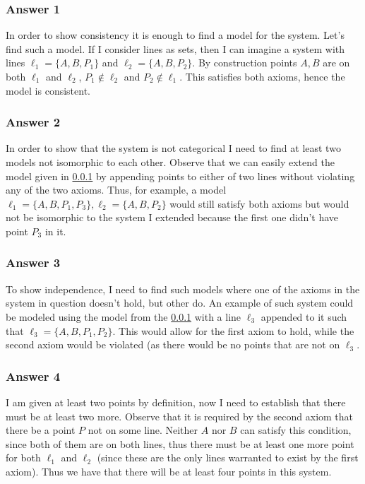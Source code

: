 \documentclass[11pt]{article}
\begin{document}
\subsubsection{Answer 1}
\label{sec-1-1-1}
In order to show consistency it is enough to find a model for the system.
Let's find such a model.  If I consider lines as sets, then I can imagine
a system with lines $\ell_1=\{A,B,P_1\}$ and $\ell_2=\{A,B,P_2\}$.
By construction points $A,B$ are on both
$\ell_1$ and $\ell_2$, $P_1 \not \in \ell_2$ and $P_2 \not \in \ell_1$.
This satisfies both axioms, hence the model is consistent.
\subsubsection{Answer 2}
\label{sec-1-1-2}
In order to show that the system is not categorical I need to find at least
two models not isomorphic to each other.  Observe that we can easily extend
the model given in \ref{sec-1-1-1} by appending points to either of two lines
without violating any of the two axioms.  Thus, for example, a model
$\ell_1=\{A,B,P_1,P_3\},\ell_2=\{A,B,P_2\}$ would still satisfy both axioms
but would not be isomorphic to the system I extended because the first one
didn't have point $P_3$ in it.
\subsubsection{Answer 3}
\label{sec-1-1-3}
To show independence, I need to find such models where one of the axioms
in the system in question doesn't hold, but other do.  An example of such
system could be modeled using the model from the \ref{sec-1-1-1} with a line $\ell_3$
appended to it such that $\ell_3=\{A,B,P_1,P_2\}$.  This would allow for
the first axiom to hold, while the second axiom would be violated (as there
would be no points that are not on $\ell_3$.
\subsubsection{Answer 4}
\label{sec-1-1-4}
I am given at least two points by definition, now I need to establish that
there must be at least two more.  Observe that it is required by the second
axiom that there be a point $P$ not on some line.  Neither $A$ nor $B$ can
satisfy this condition, since both of them are on both lines, thus there
must be at least one more point for both $\ell_1$ and $\ell_2$ (since these
are the only lines warranted to exist by the first axiom).  Thus we have
that there will be at least four points in this system.
\end{document}
